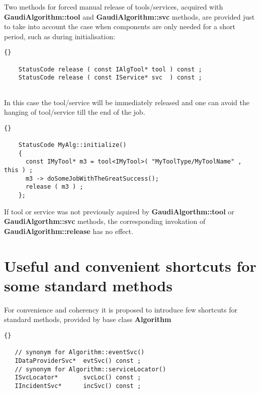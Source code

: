\documentclass{lhcbnote}
\newcommand{\bftt}         {\ttfamily\bfseries}
\begin{document}
Two methods for forced manual release of tools/services, 
acquired with {\bftt{GaudiAlgorithm::tool}} and 
{\bftt{GaudiAlgorithm::svc}} methods, are provided just to 
take into account the case when components are only needed 
for a short period, such as during initialisation:

\begin{scriptsize}
  \begin{lstlisting}{}
    
    StatusCode release ( const IAlgTool* tool ) const ;
    StatusCode release ( const IService* svc  ) const ;
    
  \end{lstlisting}
\end{scriptsize}

In this case the tool/service will be immediately released and 
one can avoid the hanging of tool/service till the end of 
the job.

\begin{scriptsize}
  \begin{lstlisting}{}

    StatusCode MyAlg::initialize() 
    {
      const IMyTool* m3 = tool<IMyTool>( "MyToolType/MyToolName" , this ) ;
      m3 -> doSomeJobWithTheGreatSuccess();
      release ( m3 ) ;
    };

  \end{lstlisting}
\end{scriptsize}

If tool or service was not previously aquired by 
{\bftt{GaudiAlgorthm::tool}} or {\bftt{GaudiAlgorthm::svc}}
methods, the corresponding invokation of 
{\bftt{GaudiAlgorithm::release}} has no effect.



\section{Useful and convenient  shortcuts for some standard methods}

For convenience and coherency it is proposed 
to introduce few shortcuts for standard methods, provided by 
base class {\bftt{Algorithm}}

\begin{scriptsize}
 \begin{lstlisting}{}

   // synonym for Algorithm::eventSvc()   
   IDataProviderSvc*  evtSvc() const ; 
   // synonym for Algorithm::serviceLocator()
   ISvcLocator*       svcLoc() const ; 
   IIncidentSvc*      incSvc() const ;

 \end{lstlisting}
\end{scriptsize}
\end{document}
